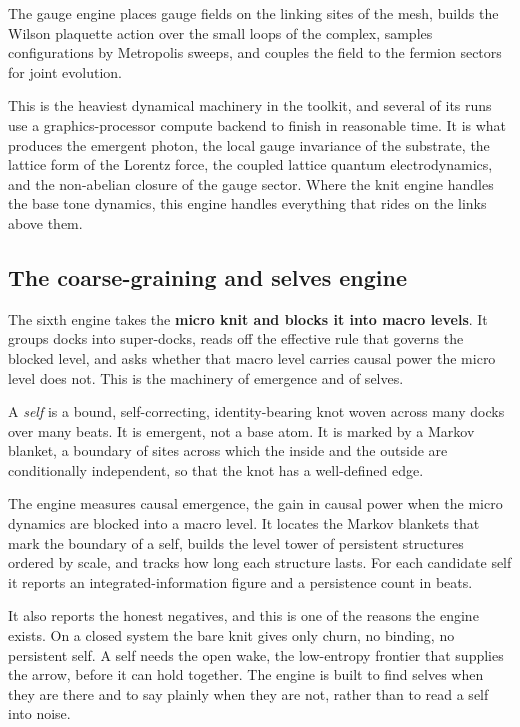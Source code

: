 \begin{definition}
The gauge engine places gauge fields on the linking sites of the mesh, builds the Wilson plaquette action over the small loops of the complex, samples configurations by Metropolis sweeps, and couples the field to the fermion sectors for joint evolution.
\end{definition}

This is the heaviest dynamical machinery in the toolkit, and several of its runs use a graphics-processor compute backend to finish in reasonable time. It is what produces the emergent photon, the local gauge invariance of the substrate, the lattice form of the Lorentz force, the coupled lattice quantum electrodynamics, and the non-abelian closure of the gauge sector. Where the knit engine handles the base tone dynamics, this engine handles everything that rides on the links above them.

\subsection{The coarse-graining and selves engine}

The sixth engine takes the \textbf{micro knit and blocks it into macro levels}. It groups docks into super-docks, reads off the effective rule that governs the blocked level, and asks whether that macro level carries causal power the micro level does not. This is the machinery of emergence and of selves.

\begin{definition}[A self]
A \emph{self} is a bound, self-correcting, identity-bearing knot woven across many docks over many beats. It is emergent, not a base atom. It is marked by a Markov blanket, a boundary of sites across which the inside and the outside are conditionally independent, so that the knot has a well-defined edge.
\end{definition}

The engine measures causal emergence, the gain in causal power when the micro dynamics are blocked into a macro level. It locates the Markov blankets that mark the boundary of a self, builds the level tower of persistent structures ordered by scale, and tracks how long each structure lasts. For each candidate self it reports an integrated-information figure and a persistence count in beats.

It also reports the honest negatives, and this is one of the reasons the engine exists. On a closed system the bare knit gives only churn, no binding, no persistent self. A self needs the open wake, the low-entropy frontier that supplies the arrow, before it can hold together. The engine is built to find selves when they are there and to say plainly when they are not, rather than to read a self into noise.

